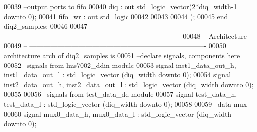 \begin{DoxyCode}
00039 \textcolor{keyword}{      --output ports to fifo}
00040         \textcolor{vhdlchar}{diq}             \textcolor{vhdlchar}{:} \textcolor{keywordflow}{out} \textcolor{comment}{std\_logic\_vector}\textcolor{vhdlchar}{(}\textcolor{vhdllogic}{}\textcolor{vhdllogic}{2}\textcolor{vhdlchar}{*}\textcolor{vhdlchar}{diq_width}\textcolor{vhdlchar}{-}\textcolor{vhdllogic}{}\textcolor{vhdllogic}{1} \textcolor{keywordflow}{downto} \textcolor{vhdllogic}{}\textcolor{vhdllogic}{0}\textcolor{vhdlchar}{)};
00041         \textcolor{vhdlchar}{fifo_wr}         \textcolor{vhdlchar}{:} \textcolor{keywordflow}{out} \textcolor{comment}{std\_logic}
00042         
00043         
00044         \textcolor{vhdlchar}{)};
00045 \textcolor{keywordflow}{end} \textcolor{vhdlchar}{diq2\_samples};
00046 
00047 \textcolor{keyword}{-- ----------------------------------------------------------------------------}
00048 \textcolor{keyword}{-- Architecture}
00049 \textcolor{keyword}{-- ----------------------------------------------------------------------------}
00050 \textcolor{keywordflow}{architecture} arch \textcolor{keywordflow}{of} diq2_samples is
00051 \textcolor{keyword}{--declare signals,  components here}
00052 \textcolor{keyword}{--signals from lms7002\_ddin module}
00053 \textcolor{keywordflow}{signal} \textcolor{vhdlchar}{inst1_data_out_h}\textcolor{vhdlchar}{,} \textcolor{vhdlchar}{inst1_data_out_l} \textcolor{vhdlchar}{:} \textcolor{comment}{std\_logic\_vector} \textcolor{vhdlchar}{(}\textcolor{vhdlchar}{diq_width} \textcolor{keywordflow}{downto} \textcolor{vhdllogic}{}\textcolor{vhdllogic}{0}\textcolor{vhdlchar}{)};
00054 \textcolor{keywordflow}{signal} \textcolor{vhdlchar}{inst2_data_out_h}\textcolor{vhdlchar}{,} \textcolor{vhdlchar}{inst2_data_out_l} \textcolor{vhdlchar}{:} \textcolor{comment}{std\_logic\_vector} \textcolor{vhdlchar}{(}\textcolor{vhdlchar}{diq_width} \textcolor{keywordflow}{downto} \textcolor{vhdllogic}{}\textcolor{vhdllogic}{0}\textcolor{vhdlchar}{)};
00055 
00056 \textcolor{keyword}{--signals from test\_data\_dd module}
00057 \textcolor{keywordflow}{signal} \textcolor{vhdlchar}{test_data_h}\textcolor{vhdlchar}{,} \textcolor{vhdlchar}{test_data_l} \textcolor{vhdlchar}{:} \textcolor{comment}{std\_logic\_vector} \textcolor{vhdlchar}{(}\textcolor{vhdlchar}{diq_width} \textcolor{keywordflow}{downto} \textcolor{vhdllogic}{}\textcolor{vhdllogic}{0}\textcolor{vhdlchar}{)};
00058 
00059 \textcolor{keyword}{--data mux}
00060 \textcolor{keywordflow}{signal} \textcolor{vhdlchar}{mux0_data_h}\textcolor{vhdlchar}{,} \textcolor{vhdlchar}{mux0_data_l}                 \textcolor{vhdlchar}{:} \textcolor{comment}{std\_logic\_vector} \textcolor{vhdlchar}{(}\textcolor{vhdlchar}{diq_width} \textcolor{keywordflow}{downto} \textcolor{vhdllogic}{}\textcolor{vhdllogic}{0}\textcolor{vhdlchar}{)};

\end{DoxyCode}
